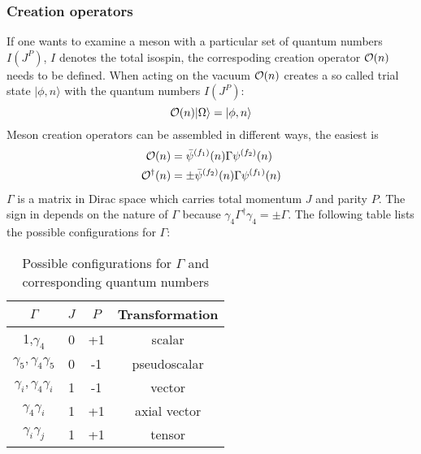     \subsubsection{Creation operators}
        If one wants to examine a meson with a particular set of quantum numbers $I(J^P)$, $I$ denotes the total isospin, the correspoding creation operator $\mathcal{O}(n)$ needs to be defined. When acting on the vacuum $\mathcal{O}(n)$ creates a so called trial state $|\phi,n\rangle$ with the quantum numbers $I(J^P)$:
        \begin{equation}
            \mathcal{O}(n)|\Omega\rangle = |\phi,n\rangle
        \end{equation}
        Meson creation operators can be assembled in different ways, the easiest is
        \begin{equation}\label{meson_creation_operator}
            \begin{aligned}
                \mathcal{O}(n) &= \bar{\psi}^{(f_1)}(n)\Gamma\psi^{(f_2)}(n)\\
                \mathcal{O}^\dagger(n) &= \pm\bar{\psi}^{(f_2)}(n)\Gamma\psi^{(f_1)}(n)
            \end{aligned}
        \end{equation}
        $\Gamma$ is a matrix in Dirac space which carries total momentum $J$ and parity $P$. The sign in  depends on the nature of $\Gamma$ because $\gamma_4\Gamma^\dagger\gamma_4 = \pm \Gamma$. The following table lists the possible configurations for $\Gamma$:
        \begin{table}[h]
            \centering
            \begin{tabular}{|c|c|c|c|}
            \hline
            \multicolumn{1}{|c|}{$\Gamma$} & \multicolumn{1}{c|}{$J$} & \multicolumn{1}{c|}{$P$} & \multicolumn{1}{c|}{Transformation} \\ \hline
             1,$\gamma_4$ & 0 & +1 &    scalar           \\
             $\gamma_5, \gamma_4\gamma_5$ & 0 & -1 & pseudoscalar\\
             $\gamma_i,\gamma_4\gamma_i$ & 1 & -1 &  vector \\
             $\gamma_4\gamma_i$ & 1 & +1 & axial vector\\
              $\gamma_i\gamma_j$ & 1 & +1 & tensor \\
              \hline
            \end{tabular}
            \caption{Possible configurations for $\Gamma$ and corresponding quantum numbers}
            \label{my-label}
        \end{table}
